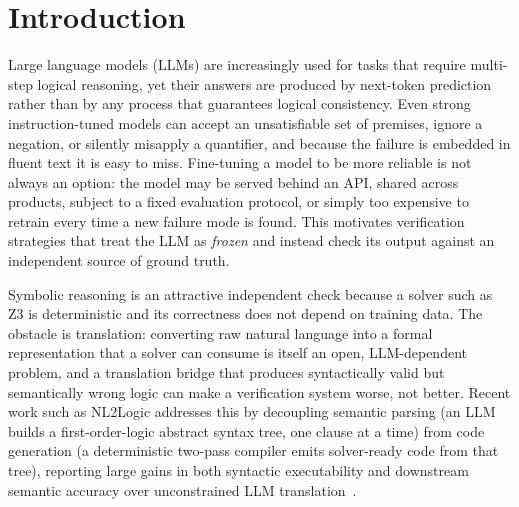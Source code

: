 \documentclass[conference]{IEEEtran}
\begin{document}
\section{Introduction}

Large language models (LLMs) are increasingly used for tasks that require multi-step logical reasoning, yet their answers are produced by next-token prediction rather than by any process that guarantees logical consistency. Even strong instruction-tuned models can accept an unsatisfiable set of premises, ignore a negation, or silently misapply a quantifier, and because the failure is embedded in fluent text it is easy to miss. Fine-tuning a model to be more reliable is not always an option: the model may be served behind an API, shared across products, subject to a fixed evaluation protocol, or simply too expensive to retrain every time a new failure mode is found. This motivates verification strategies that treat the LLM as \emph{frozen} and instead check its output against an independent source of ground truth.

Symbolic reasoning is an attractive independent check because a solver such as Z3 is deterministic and its correctness does not depend on training data. The obstacle is translation: converting raw natural language into a formal representation that a solver can consume is itself an open, LLM-dependent problem, and a translation bridge that produces syntactically valid but semantically wrong logic can make a verification system worse, not better. Recent work such as NL2Logic addresses this by decoupling semantic parsing (an LLM builds a first-order-logic abstract syntax tree, one clause at a time) from code generation (a deterministic two-pass compiler emits solver-ready code from that tree), reporting large gains in both syntactic executability and downstream semantic accuracy over unconstrained LLM translation~\cite{putra2026nl2logic}.
\end{document}
